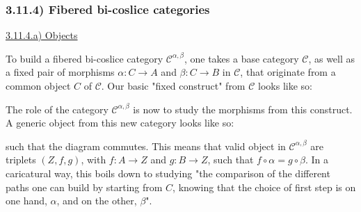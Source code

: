 \subsubsection*{3.11.4) Fibered bi-coslice categories}

\vspace{5mm}
\underline{3.11.4.a) Objects}

To build a fibered bi-coslice category $\mathcal{C}^{\alpha, \beta}$, one takes a base category $\mathcal{C}$, as well as a fixed pair of morphisms $\alpha : C \to A$ and $\beta : C \to B$ in $\mathcal{C}$, that originate from a common object $C$ of $\mathcal{C}$. Our basic "fixed construct" from $\mathcal{C}$ looks like so: 


The role of the category $\mathcal{C}^{\alpha, \beta}$ is now to study the morphisms from this construct. A generic object from this new category looks like so:


such that the diagram commutes. This means that valid object in $\mathcal{C}^{\alpha, \beta}$ are triplets $(Z, f, g)$, with $f : A \to Z$ and $g : B \to Z$, such that $f \circ \alpha = g \circ \beta$. In a caricatural way, this boils down to studying "the comparison of the different paths one can build by starting from $C$, knowing that the choice of first step is on one hand, $\alpha$, and on the other, $\beta$".


